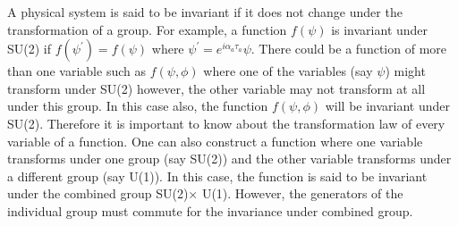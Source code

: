 A physical system is said to be invariant if it does not change under the
transformation of a group. For example, a function $f(\psi)$ is invariant 
under SU(2) if $f(\psi^\prime) = f(\psi)$ where $\psi^\prime = e^{i\alpha_a\tau_a} \psi$. There could be a function of more than one variable such as 
$f(\psi,\phi)$ where one of the variables (say $\psi$) might transform under 
SU(2) however, the other variable may not transform at all under this group. In
this case also, the function $f(\psi,\phi)$ will be invariant under SU(2). 
Therefore it is important to know about the transformation law of every variable
of a function. One can also construct a function where one variable transforms 
under one group (say SU(2)) and the other variable transforms under a different 
group (say U(1)). In this case, the function is said to be invariant under 
the combined group SU(2)$\times$ U(1). However, the generators of the individual 
group must commute for the invariance under combined group.

